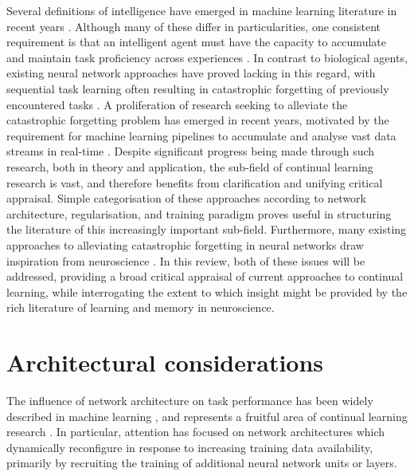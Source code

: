 \documentclass{article} %
\begin{document}
Several definitions of intelligence have emerged in machine learning literature in recent years \citep{legg2007universal, tenenbaum2011grow}. Although many of these differ in particularities, one consistent requirement is that an intelligent agent must have the capacity to accumulate and maintain task proficiency across experiences \citep{hinton1986learning, hassabis2017neuroscience}. In contrast to biological agents, existing neural network approaches have proved lacking in this regard, with sequential task learning often resulting in catastrophic forgetting of previously encountered tasks \citep{french1999catastrophic,mccloskey1989catastrophic,ratcliff1990connectionist}. A proliferation of research seeking to alleviate the catastrophic forgetting problem has emerged in recent years, motivated by the requirement for machine learning pipelines to accumulate and analyse vast data streams in real-time \citep{parisi2019continual, hadsell2020embracing}. Despite significant progress being made through such research, both in theory and application, the sub-field of continual learning research is vast, and therefore benefits from clarification and unifying critical appraisal. Simple categorisation of these approaches according to network architecture, regularisation, and training paradigm proves useful in structuring the literature of this increasingly important sub-field. Furthermore, many existing approaches to alleviating catastrophic forgetting in neural networks draw inspiration from neuroscience \citep{hassabis2017neuroscience}. In this review, both of these issues will be addressed, providing a broad critical appraisal of current approaches to continual learning, while interrogating the extent to which insight might be provided by the rich literature of learning and memory in neuroscience.

\section*{Architectural considerations}
\label{gen_inst}

The influence of network architecture on task performance has been widely described in machine learning \citep{lecun2015deep}, and represents a fruitful area of continual learning research \citep{parisi2019continual,kemker2017fearnet}. In particular, attention has focused on network architectures which dynamically reconfigure in response to increasing training data availability, primarily by recruiting the training of additional neural network units or layers.
\end{document}
